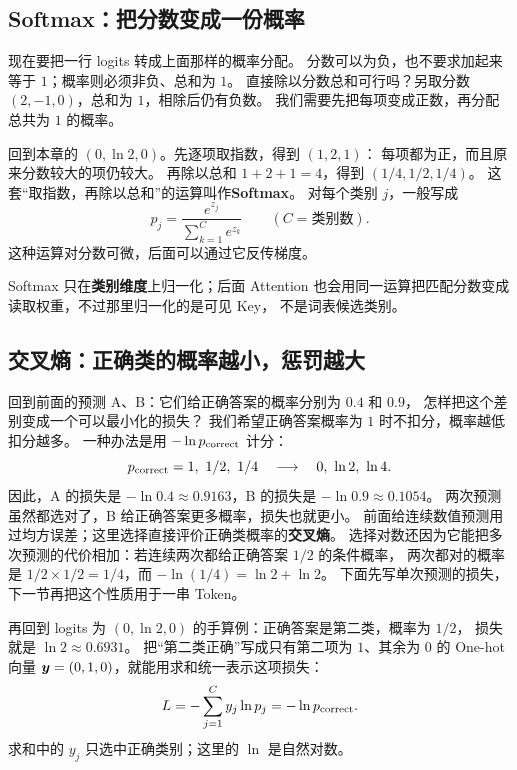 \subsection{Softmax：把分数变成一份概率}
\label{concept:softmax}

现在要把一行 logits 转成上面那样的概率分配。
分数可以为负，也不要求加起来等于 $1$；概率则必须非负、总和为 $1$。
直接除以分数总和可行吗？另取分数 $(2,-1,0)$，总和为 $1$，相除后仍有负数。
我们需要先把每项变成正数，再分配总共为 $1$ 的概率。

回到本章的 $(0,\ln2,0)$。先逐项取指数，得到 $(1,2,1)$：
每项都为正，而且原来分数较大的项仍较大。
再除以总和 $1+2+1=4$，得到 $(1/4,1/2,1/4)$。
这套“取指数，再除以总和”的运算叫作\textbf{Softmax}。
对每个类别 $j$，一般写成
\begin{equation}
\boxed{p_j=\frac{e^{z_j}}{\sum_{k=1}^{C}e^{z_k}}}\qquad
(C=\text{类别数}).
\label{eq:early-class-softmax}
\end{equation}
这种运算对分数可微，后面可以通过它反传梯度。


Softmax 只在\textbf{类别维度}上归一化；后面 Attention
也会用同一运算把匹配分数变成读取权重，不过那里归一化的是可见 Key，
不是词表候选类别。


\subsection{交叉熵：正确类的概率越小，惩罚越大}
\label{concept:cross-entropy}

回到前面的预测 A、B：它们给正确答案的概率分别为 $0.4$ 和 $0.9$，
怎样把这个差别变成一个可以最小化的损失？
我们希望正确答案概率为 $1$ 时不扣分，概率越低扣分越多。
一种办法是用 $-\ln p_{\rm correct}$ 计分：
\[
p_{\rm correct}=1,\ 1/2,\ 1/4
\quad\longrightarrow\quad
0,\ \ln2,\ \ln4.
\]
因此，A 的损失是 $-\ln0.4\approx0.9163$，B 的损失是 $-\ln0.9\approx0.1054$。
两次预测虽然都选对了，B 给正确答案更多概率，损失也就更小。
前面给连续数值预测用过均方误差；这里选择直接评价正确类概率的\textbf{交叉熵}。
选择对数还因为它能把多次预测的代价相加：若连续两次都给正确答案 $1/2$ 的条件概率，
两次都对的概率是 $1/2\times1/2=1/4$，而 $-\ln(1/4)=\ln2+\ln2$。
下面先写单次预测的损失，下一节再把这个性质用于一串 Token。

再回到 logits 为 $(0,\ln2,0)$ 的手算例：正确答案是第二类，概率为 $1/2$，
损失就是 $\ln2\approx0.6931$。
把“第二类正确”写成只有第二项为 $1$、其余为 $0$ 的 One-hot 向量
$\vect y=(0,1,0)$，就能用求和统一表示这项损失：
\begin{equation}
\boxed{L=-\sum_{j=1}^{C}y_j\ln p_j=-\ln p_{\rm correct}.}
\label{eq:early-class-cross-entropy}
\end{equation}
求和中的 $y_j$ 只选中正确类别；这里的 $\ln$ 是自然对数。

